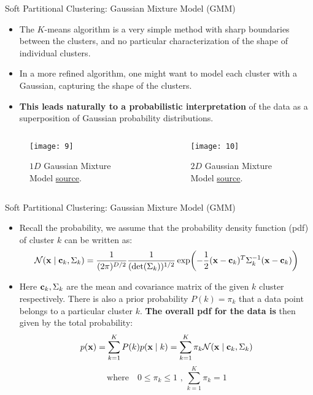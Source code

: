 \documentclass[compress,oilve]{beamer}
\begin{document}
\begin{frame}{Soft Partitional Clustering: Gaussian Mixture Model (GMM)}
\begin{itemize}
\item The $K$-means algorithm is a very simple method with sharp boundaries between the clusters, and no particular characterization of the shape of individual clusters.
\item In a more refined algorithm, one might want to model each cluster with a Gaussian, capturing the shape of the clusters.
\item \textbf{This leads naturally to a probabilistic interpretation} of the data as a superposition of Gaussian probability distributions.
\end{itemize}
\begin{columns}
	\begin{column}{0.5\textwidth}
		\begin{figure}
			 \centering
			 \texttt{[image: 9]} 
			 \caption{$1D$ Gaussian Mixture Model \href{https://towardsdatascience.com/gaussian-mixture-models-explained-6986aaf5a95}{source}.}
		\end{figure}
	\end{column}
	\begin{column}{0.5\textwidth}
		\begin{figure}
			 \centering
			 \texttt{[image: 10]}  
			 \caption{$2D$ Gaussian Mixture Model \href{http://pypr.sourceforge.net/mog.html}{source}.}
		\end{figure}
	\end{column}
\end{columns}
\end{frame}


\begin{frame}{Soft Partitional Clustering: Gaussian Mixture Model (GMM)}
\begin{itemize}
\item Recall the probability, we assume that  the probability density function (pdf) of cluster $k$ can be written as:
$$ \mathcal{N}(\mathbf{x} \mid \mathbf{c_{\mathnormal k}}, \Sigma_{k}) = \frac{1}{(2\pi)^{D/2}}\frac{1}{(\det(\Sigma_{k}))^{1/2}}\exp(-\frac{1}{2}(\mathbf{x} - \mathbf{c_{\mathnormal k}})^{T}\Sigma_{k}^{-1}(\mathbf{x} - \mathbf{c_{\mathnormal k}}))$$
\item Here $ \mathbf{c_{\mathnormal k}}, \Sigma_{k} $ are the mean and covariance matrix of the given $ k $ cluster respectively. There is also a prior probability $P(k) = \pi_{k} $ that a data point belongs to a particular cluster $k$. \textbf{The overall pdf for the data is} then given by the total probability:
$$ p(\mathbf{x}) = \displaystyle\sum_{k=1}^{K} P(k) p(\mathbf{x} \mid k) = \displaystyle\sum_{k=1}^{K} \pi_{k} \mathcal{N}(\mathbf{x} \mid \mathbf{c_{\mathnormal k}}, \Sigma_{k}) $$
$$ \text{where} \quad 0 \leq \pi_{k} \leq 1 \text{ , }\displaystyle\sum_{k=1}^{K} \pi_{k} = 1 $$
\end{itemize}
\end{frame}
\end{document}
